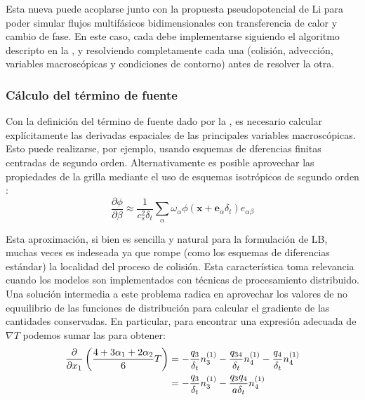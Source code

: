 Esta nueva \lbe{} puede acoplarse junto con la propuesta pseudopotencial de Li para poder simular flujos multif\'asicos bidimensionales con transferencia de calor y cambio de fase. En este caso, cada \lbe{} debe implementarse siguiendo el algoritmo descripto en la , y resolviendo completamente cada una (colisi\'on, advecci\'on, variables macrosc\'opicas y condiciones de contorno) antes de resolver la otra.


\subsubsection{C\'alculo del t\'ermino de fuente}

Con la definici\'on del t\'ermino de fuente dado por la , es necesario calcular expl\'icitamente las derivadas espaciales de las principales variables macrosc\'opicas. Esto puede realizarse, por ejemplo, usando esquemas de dferencias finitas centradas de segundo orden. Alternativamente es posible aprovechar las propiedades de la grilla mediante el uso de esquemas isotr\'opicos de segundo orden \cite{lee_stable_2005}:
\begin{equation}
	\dfrac{\partial \phi}{\partial \beta} \approx \dfrac{1}{c_s^2 \delta_t} \sum_{\alpha} \omega_{\alpha} \phi(\bm{x} + \bm{e}_{\alpha}\delta_t)e_{\alpha\beta}
\end{equation}

Esta aproximaci\'on, si bien es sencilla y natural para la formulaci\'on de LB, muchas veces es indeseada ya que rompe (como los esquemas de diferencias est\'andar) la localidad del proceso de colisi\'on. Esta caracter\'istica toma relevancia cuando los modelos son implementados con t\'ecnicas de procesamiento distribuido. Una soluci\'on intermedia a este problema radica en aprovechar los valores de no equuilibrio de las funciones de distribuci\'on para calcular el gradiente de las cantidades conservadas. En particular, para encontrar una expresi\'on adecuada de $\nabla T$ podemos sumar las  para obtener:
\begin{equation}
\begin{aligned}
	\dfrac{\partial}{\partial x_1} \left( \dfrac{4+3\alpha_1+2\alpha_2}{6} T \right) &= -\dfrac{q_3}{\delta_t} n_{3}^{(1)} - \dfrac{q_{34}}{\delta_t} n_{4}^{(1)} - \dfrac{q_4}{\delta_t} n_{4}^{(1)} \\
	&= -\dfrac{q_3}{\delta_t} n_{3}^{(1)} - \dfrac{q_3 q_4}{a \delta_t} n_{4}^{(1)}
\end{aligned}
	\label{eq:partial_1_x}
\end{equation}

